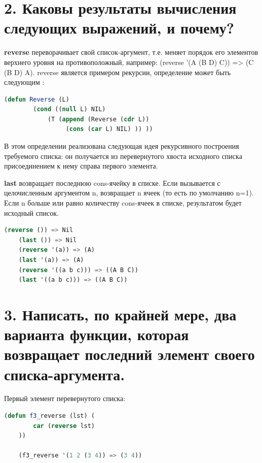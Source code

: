 \documentclass[12pt]{report}
\begin{document}
\section*{2. Каковы результаты вычисления следующих выражений, и почему?
}

\textbf{reverse} переворачивает свой список-аргумент, т.е. меняет порядок его элементов  верхнего уровня на противоположный, например:  (reverse '(A (B D) C)) => (C (B D) A). reverse является примером рекурсии, определение может быть следующим \cite{bolshakova}:

\begin{lstlisting}[language=Lisp]	
	(defun Reverse (L) 
		(cond ((null L) NIL)
			(T (append (Reverse (cdr L)) 
				 (cons (car L) NIL) )) ))
\end{lstlisting}

В этом определении реализована следующая идея рекурсивного построения требуемого списка: он получается из перевернутого хвоста исходного списка присоединением к нему справа первого элемента. 



\textbf{last} возвращает последнюю cons-ячейку в списке. Если вызывается с целочисленным аргументом n, возвращает n ячеек (то есть по умолчанию n=1).
Если n больше или равно количеству cons-ячеек в списке, результатом будет исходный список.



\begin{lstlisting}[language=Lisp]
	(reverse ()) => Nil 
	(last ()) => Nil
	(reverse '(a)) => (A)
	(last '(a)) => (A)
	(reverse '((a b c))) => ((A B C))
	(last '((a b c))) => ((A B C))
\end{lstlisting}


\section*{3. Написать, по крайней мере, два варианта функции, которая возвращает последний элемент своего списка-аргумента.}

Первый элемент перевернутого списка:
\begin{lstlisting}[language=Lisp]
	(defun f3_reverse (lst) (
		car (reverse lst)
	))
	
	(f3_reverse '(1 2 (3 4)) => (3 4))
\end{lstlisting}
\end{document}
